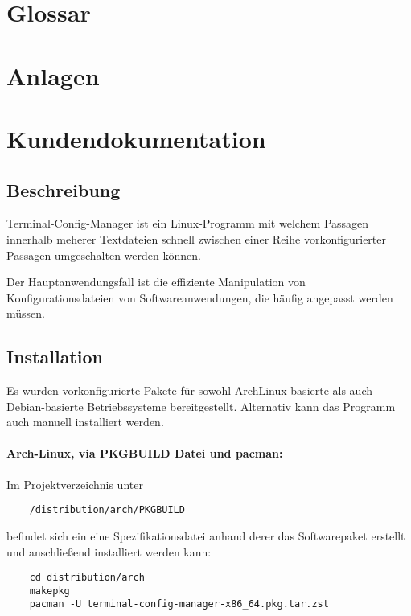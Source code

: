 \documentclass[a4paper,11pt]{scrartcl} %
\begin{document}

\section{Glossar}


\section{Anlagen}

\section{Kundendokumentation}

\subsection{Beschreibung}
Terminal-Config-Manager ist ein Linux-Programm mit welchem
Passagen innerhalb meherer Textdateien schnell zwischen einer Reihe
vorkonfigurierter Passagen umgeschalten werden können.

Der Hauptanwendungsfall ist die effiziente  Manipulation von
Konfigurationsdateien von Softwareanwendungen, die häufig angepasst
werden müssen.

\subsection{Installation}
Es wurden vorkonfigurierte Pakete für sowohl ArchLinux-basierte als auch
Debian-basierte Betriebssysteme bereitgestellt. Alternativ
kann das Programm auch manuell installiert werden.

\paragraph{Arch-Linux, via PKGBUILD Datei und pacman:}
Im Projektverzeichnis unter

\begin{verbatim}
	/distribution/arch/PKGBUILD
\end{verbatim}

befindet sich ein eine Spezifikationsdatei anhand derer das Softwarepaket
erstellt und anschließend installiert werden kann:

\begin{verbatim}
	cd distribution/arch
	makepkg
	pacman -U terminal-config-manager-x86_64.pkg.tar.zst
\end{verbatim}
\end{document}

